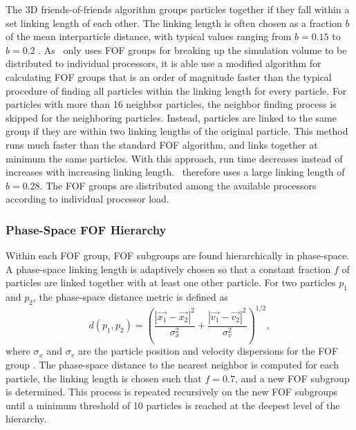 The 3D friends-of-friends algorithm groups particles together if they fall within a set linking length of each other.  The linking length is often chosen as a fraction $b$ of the mean interparticle distance, with typical values ranging from $b = 0.15$ to $b = 0.2$ \cn.  As \rockstar\ only uses FOF groups for breaking up the simulation volume to be distributed to individual processors, it is able use a modified algorithm for calculating FOF groups that is an order of magnitude faster than the typical procedure of finding all particles within the linking length for every particle.  For particles with more than 16 neighbor particles, the neighbor finding process is skipped for the neighboring particles.  Instead, particles are linked to the same group if they are within two linking lengths of the original particle.  This method runs much faster than the standard FOF algorithm, and links together at minimum the same particles.  With this approach, run time decreases instead of increases with increasing linking length.  \rockstar\ therefore uses a large linking length of $b = 0.28$.  The FOF groups are distributed among the available processors according to individual processor load.



\subsubsection{Phase-Space FOF Hierarchy}
\label{subsubsec:rockstar--halo_finding--phase_space}


Within each FOF group, FOF subgroups are found hierarchically in phase-space.  A phase-space linking length is adaptively chosen so that a constant fraction $f$ of particles are linked together with at least one other particle.  For two particles $p_{1}$ and $p_{2}$, the phase-space distance metric is defined as
\begin{equation}
	d(p_{1}, p_{2}) = \left( \frac{\left| \vec{x_{1}} - \vec{x_{2}} \right|^{2}}{\sigma_{x}^{2}} + \frac{\left| \vec{v_{1}} - \vec{v_{2}} \right|^{2}}{\sigma_{v}^{2}} \right)^{1/2},
\end{equation}
where $\sigma_{x}$ and $\sigma_{v}$ are the particle position and velocity dispersions for the FOF group \cn.  The phase-space distance to the nearest neighbor is computed for each particle, the linking length is chosen such that $f = 0.7$, and a new FOF subgroup is determined.  This process is repeated recursively on the new FOF subgroups until a minimum threshold of 10 particles is reached at the deepest level of the hierarchy.



